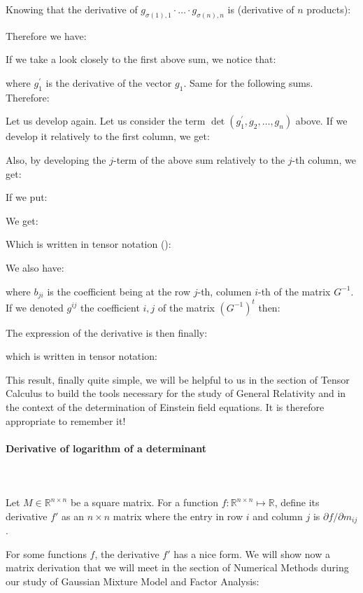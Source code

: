 	Knowing that the derivative of $g_{\sigma(1),1}\cdot \ldots \cdot g_{\sigma(n),n}$ is (derivative of $n$ products):
	
	Therefore we have:
	
	If we take a look closely to the first above sum, we notice that:
	
	where $g_1^{\prime}$ is the derivative of the vector $g_1$. Same for the following sums. Therefore:
	
	Let us develop again. Let us consider the term $\det(g_1^{\prime},g_2,\ldots,g_n)$ above. If we develop it relatively to the first column, we get:
	
	 Also, by developing the $j$-term of the above sum relatively to the $j$-th column, we get:
	
	If we put:
	
	We get:
	
	Which is written in tensor notation ():
	
	We also have:
	
	where $b_{ji}$ is the coefficient being at the row $j$-th, columen $i$-th of the matrix $G^{-1}$. If we denoted $g^{ij}$ the coefficient $i,j$ of the matrix $(G^{-1})^t$ then:
	
	The expression of the derivative is then finally:
	
	which is written in tensor notation:
	
	This result, finally quite simple, we will be helpful to us in the section of Tensor Calculus to build the tools necessary for the study of General Relativity and in the context of the determination of Einstein field equations. It is therefore appropriate to remember it!
	
	\paragraph{Derivative of logarithm of a determinant}\label{derivative of logarithm of a determinant}\mbox{}\\\\
	Let $M \in \mathbb{R}^{n \times n}$ be a square matrix. For a function $f: \mathbb{R}^{n \times n} \mapsto \mathbb{R}$, define its derivative $f'$ as an $n \times n$ matrix where the entry in row $i$ and column $j$ is $\partial f/\partial m_{ij}$.

	For some functions $f$, the derivative $f'$ has a nice form. We will show now a matrix derivation that we will meet in the section of Numerical Methods during our study of Gaussian Mixture Model and Factor Analysis:
	
